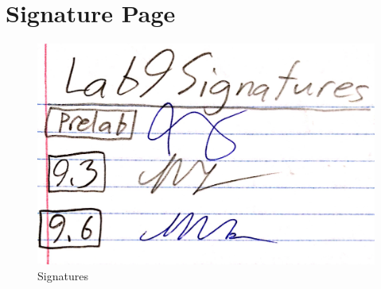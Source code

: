 \documentclass{article}
\begin{document}
\section{Signature Page}
\begin{figure}[H]
    \centering
    \includegraphics[scale = 0.15]{sig.JPG}
    \caption{Signatures}
    \label{fig:my_label}
\end{figure}



{}

\end{document}
